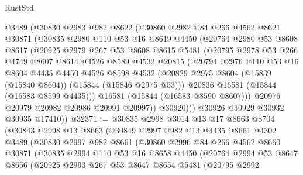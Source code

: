 \begin{lexlean}{RustStd}
\begin{coremodule}
        @3489
        (@30830
          @2983
          @982
          @8622
          (@30860
            @2982
            @84
            @266
            @4562
            @8621
            @30871
            (@30835
              @2980
              @110
              @53
              @16
              @8619
              @4450
              (@20764
                @2980
                @53
                @8608
                @8617
                (@20925
                  @2979
                  @267
                  @53
                  @8608
                  @8615
                  @5481
                  (@20795
                    @2978
                    @53
                    @266
                    @4749
                    @8607
                    @8614
                    @4526
                    @8589
                    @4532
                    @20815
                    (@20794
                      @2976
                      @110
                      @53
                      @16
                      @8604
                      @4435
                      @4450
                      @4526
                      @8598
                      @4532
                      (@20829 @2975 @8604 (@15839 (@15840 @8604)) (@15844 (@15846 @2975 @53)))
                      @20836
                      @16581
                      (@15844 (@16583 @8599 @4435)))
                    @16581
                    (@15844 (@16583 @8590 @8607)))
                  @20976
                  @20979
                  @20982
                  @20986
                  @20991
                  @20997))
              @30920)))
        @30926
        @30929
        @30932
        @30935
        @17410))
@32371 := @30835
    @2998
    @3014
    @13
    @17
    @8663
    @8704
    (@30843
      @2998
      @13
      @8663
      (@30849
        @2997
        @982
        @13
        @4435
        @8661
        @4302
        @3489
        (@30830
          @2997
          @982
          @8661
          (@30860
            @2996
            @84
            @266
            @4562
            @8660
            @30871
            (@30835
              @2994
              @110
              @53
              @16
              @8658
              @4450
              (@20764
                @2994
                @53
                @8647
                @8656
                (@20925
                  @2993
                  @267
                  @53
                  @8647
                  @8654
                  @5481
                  (@20795
                    @2992

\end{coremodule}
\end{lexlean}
